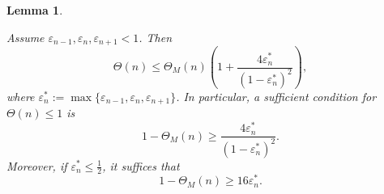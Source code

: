 \documentclass[12pt]{article}
\newtheorem{lem}[thm]{Lemma}
\numberwithin{equation}{section}
\begin{document}
\begin{lem}\label{lem:factor}

Assume $\varepsilon_{n-1},\varepsilon_n,\varepsilon_{n+1}<1$. Then
\begin{equation}\label{eq:factor-consequence-exact}
\Theta(n)\le\Theta_M(n)\left(1+\frac{4\varepsilon_n^\ast}
{(1-\varepsilon_n^\ast)^2}\right),
\end{equation}
where $\varepsilon_n^\ast:=\max\{\varepsilon_{n-1},\varepsilon_n,\varepsilon_{n+1}\}$.
In particular, a sufficient condition for $\Theta(n)\le 1$ is
\begin{equation}\label{eq:gap-vs-error-exact}
1-\Theta_M(n)\ge\frac{4\varepsilon_n^\ast}{(1-\varepsilon_n^\ast)^2}.
\end{equation}
Moreover, if $\varepsilon_n^\ast\le \tfrac12$, it suffices that
\begin{equation}\label{eq:gap-vs-error-crude}
1-\Theta_M(n)\ge16\varepsilon_n^\ast.
\end{equation}
\end{lem}
\end{document}
